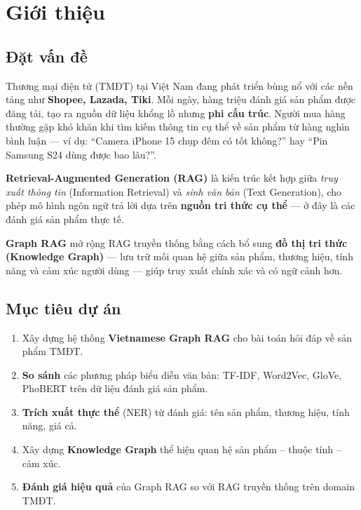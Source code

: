\documentclass[12pt,a4paper]{article}
\begin{document}
\section{Giới thiệu}

\subsection{Đặt vấn đề}

Thương mại điện tử (TMĐT) tại Việt Nam đang phát triển bùng nổ với các nền tảng như \textbf{Shopee, Lazada, Tiki}. Mỗi ngày, hàng triệu đánh giá sản phẩm được đăng tải, tạo ra nguồn dữ liệu khổng lồ nhưng \textbf{phi cấu trúc}. Người mua hàng thường gặp khó khăn khi tìm kiếm thông tin cụ thể về sản phẩm từ hàng nghìn bình luận --- ví dụ: ``Camera iPhone 15 chụp đêm có tốt không?'' hay ``Pin Samsung S24 dùng được bao lâu?''.

\textbf{Retrieval-Augmented Generation (RAG)} là kiến trúc kết hợp giữa \textit{truy xuất thông tin} (Information Retrieval) và \textit{sinh văn bản} (Text Generation), cho phép mô hình ngôn ngữ trả lời dựa trên \textbf{nguồn tri thức cụ thể} --- ở đây là các đánh giá sản phẩm thực tế.

\textbf{Graph RAG} mở rộng RAG truyền thống bằng cách bổ sung \textbf{đồ thị tri thức (Knowledge Graph)} --- lưu trữ mối quan hệ giữa sản phẩm, thương hiệu, tính năng và cảm xúc người dùng --- giúp truy xuất chính xác và có ngữ cảnh hơn.

\subsection{Mục tiêu dự án}

\begin{enumerate}[leftmargin=2cm]
  \item Xây dựng hệ thống \textbf{Vietnamese Graph RAG} cho bài toán hỏi đáp về sản phẩm TMĐT.
  \item \textbf{So sánh} các phương pháp biểu diễn văn bản: TF-IDF, Word2Vec, GloVe, PhoBERT trên dữ liệu đánh giá sản phẩm.
  \item \textbf{Trích xuất thực thể} (NER) từ đánh giá: tên sản phẩm, thương hiệu, tính năng, giá cả.
  \item Xây dựng \textbf{Knowledge Graph} thể hiện quan hệ sản phẩm -- thuộc tính -- cảm xúc.
  \item \textbf{Đánh giá hiệu quả} của Graph RAG so với RAG truyền thống trên domain TMĐT.
\end{enumerate}
\end{document}
